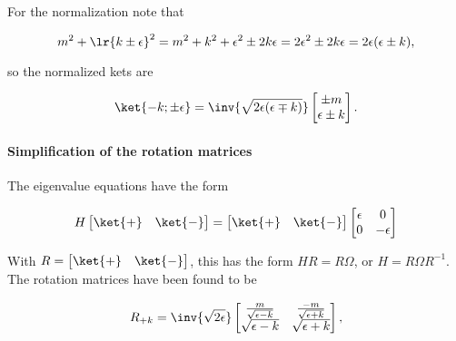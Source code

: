 For the normalization note that

\begin{dmath}\label{eqn:gradQuantumProblemSet4Problem3:201}
m^2 + \lr{ k \pm \epsilon }^2
=
m^2 + k^2 + \epsilon^2 \pm 2 k \epsilon
=
2 \epsilon^2 \pm 2 k \epsilon
=
2 \epsilon (\epsilon \pm k),
\end{dmath}

so the normalized kets are

\begin{dmath}\label{eqn:gradQuantumProblemSet4Problem3:221}
\ket{-k; \pm\epsilon} =
\inv{\sqrt{2 \epsilon(\epsilon \mp k)}}
\begin{bmatrix}
\pm m \\
\epsilon \pm k
\end{bmatrix}.
\end{dmath}

\paragraph{Simplification of the rotation matrices}

The eigenvalue equations have the form

\begin{dmath}\label{eqn:gradQuantumProblemSet4Problem3:240}
H
\begin{bmatrix}
\ket{+} & \ket{-}
\end{bmatrix}
=
\begin{bmatrix}
\ket{+} & \ket{-}
\end{bmatrix}
\begin{bmatrix}
\epsilon & 0 \\
0 & -\epsilon
\end{bmatrix}
\end{dmath}

With \( R = \begin{bmatrix} \ket{+} & \ket{-} \end{bmatrix} \), this has the form \( H R = R \Omega \), or \( H = R \Omega R^{-1} \).  The rotation matrices have been found to be

\begin{dmath}\label{eqn:gradQuantumProblemSet4Problem3:260}
R_{+k}
=
\inv{\sqrt{2\epsilon}}
\begin{bmatrix}
\frac{m}{\sqrt{\epsilon - k}} & \frac{-m}{\sqrt{\epsilon + k}} \\
\sqrt{\epsilon - k} & \sqrt{\epsilon + k}
\end{bmatrix},
\end{dmath}

